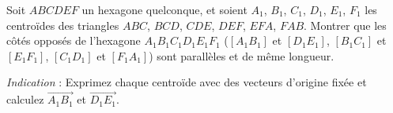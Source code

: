 Soit $ABCDEF$ un hexagone quelconque, et soient $A_1$, $B_1$, $C_1$, $D_1$, $E_1$, $F_1$
les centroïdes des triangles $ABC$, $BCD$, $CDE$, $DEF$, $EFA$, $FAB$.
Montrer que les côtés opposés de l'hexagone $A_1B_1C_1D_1E_1F_1$
($[A_1B_1]$ et $[D_1E_1]$, $[B_1C_1]$ et $[E_1F_1]$, $[C_1D_1]$ et
$[F_1A_1]$) sont parallèles et de même longueur.

\emph{Indication} : Exprimez chaque centroïde avec des vecteurs d'origine
fixée et calculez $\overrightarrow{A_1B_1}$ et $\overrightarrow{D_1E_1}$.
